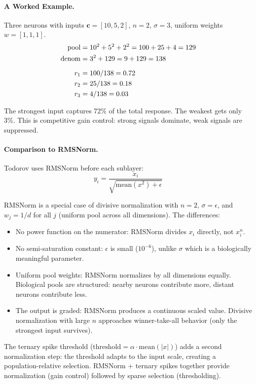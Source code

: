 \documentclass[11pt,a4paper]{article}
\begin{document}
\paragraph{A Worked Example.}

Three neurons with inputs $\mathbf{c} = [10, 5, 2]$, $n = 2$, $\sigma = 3$, uniform weights $w = [1, 1, 1]$.
\begin{align}
  \mathrm{pool} &= 10^2 + 5^2 + 2^2 = 100 + 25 + 4 = 129 \notag\\
  \mathrm{denom} &= 3^2 + 129 = 9 + 129 = 138 \notag\\[6pt]
  r_1 &= 100 / 138 = 0.72 \notag\\
  r_2 &= 25 / 138 = 0.18 \notag\\
  r_3 &= 4 / 138 = 0.03 \notag
\end{align}

The strongest input captures 72\% of the total response. The weakest gets only 3\%. This is competitive gain control: strong signals dominate, weak signals are suppressed.

\paragraph{Comparison to RMSNorm.}

Todorov uses RMSNorm before each sublayer:
\[
  y_i = \frac{x_i}{\sqrt{\mathrm{mean}(x^2) + \epsilon}}
\]

RMSNorm is a special case of divisive normalization with $n = 2$, $\sigma = \epsilon$, and $w_j = 1/d$ for all $j$ (uniform pool across all dimensions). The differences:
\begin{itemize}
  \item No power function on the numerator: RMSNorm divides $x_i$ directly, not $x_i^n$.
  \item No semi-saturation constant: $\epsilon$ is small ($10^{-6}$), unlike $\sigma$ which is a biologically meaningful parameter.
  \item Uniform pool weights: RMSNorm normalizes by all dimensions equally. Biological pools are structured: nearby neurons contribute more, distant neurons contribute less.
  \item The output is graded: RMSNorm produces a continuous scaled value. Divisive normalization with large $n$ approaches winner-take-all behavior (only the strongest input survives).
\end{itemize}

The ternary spike threshold ($\mathrm{threshold} = \alpha \cdot \mathrm{mean}(|x|)$) adds a second normalization step: the threshold adapts to the input scale, creating a population-relative selection. RMSNorm + ternary spikes together provide normalization (gain control) followed by sparse selection (thresholding).
\end{document}
